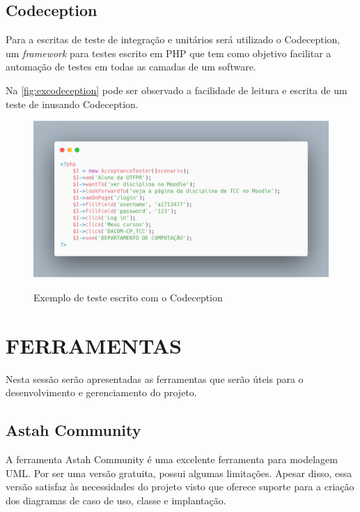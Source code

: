 \subsection{Codeception}
\label{sub:codeception}

Para a escritas de teste de integração e unitários será utilizado o Codeception, um \textit{framework} para testes escrito em PHP que tem como objetivo facilitar a automação de testes em todas as camadas de um software.

Na \autoref{fig:excodeception} pode ser observado a facilidade de leitura e escrita de um teste de inusando Codeception.

\begin{figure}[H]
    \centering
    \caption{Exemplo de teste escrito com o Codeception}
    \includegraphics[width=13cm]{dados/figuras/teste_codeception.png}
    \label{fig:excodeception}
\end{figure}

\section{FERRAMENTAS}
\label{sec:ferramentas}
Nesta sessão serão apresentadas as ferramentas que serão úteis para o desenvolvimento e gerenciamento do projeto.

\subsection{Astah Community}
\label{sub:astah}

A ferramenta Astah Community é uma excelente ferramenta para modelagem UML. Por ser uma versão gratuita, possui algumas limitações. Apesar disso, essa versão satisfaz às necessidades do projeto visto que oferece suporte para a criação dos diagramas de caso de uso, classe e implantação.

